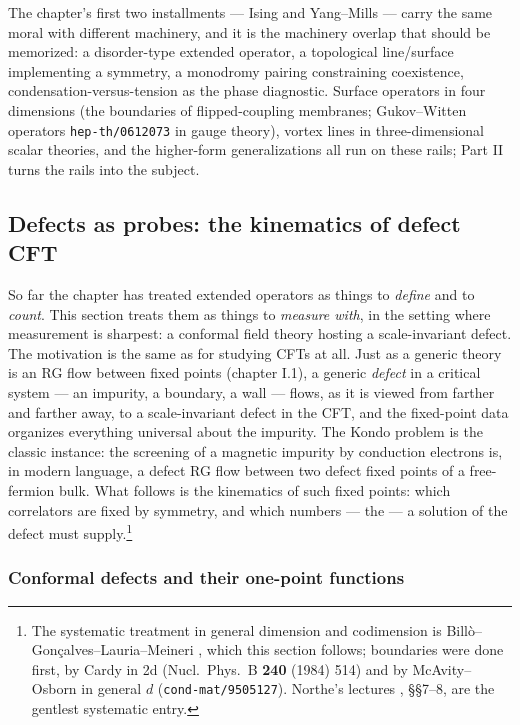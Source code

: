 The chapter's first two installments --- Ising and Yang--Mills --- carry
the same moral with different machinery, and it is the machinery overlap
that should be memorized: a disorder-type extended operator, a
topological line/surface implementing a symmetry, a monodromy pairing
constraining coexistence, condensation-versus-tension as the phase
diagnostic. Surface operators in four dimensions (the boundaries of
flipped-coupling membranes; Gukov--Witten operators
\texttt{hep-th/0612073} in gauge theory), vortex lines in
three-dimensional scalar theories, and the higher-form generalizations
all run on these rails; Part II turns the rails into the subject.


\subsection{Defects as probes: the kinematics of defect CFT}
\label{sec:defect-cft}

So far the chapter has treated extended operators as things to
\emph{define} and to \emph{count}. This section treats them as things to
\emph{measure with}, in the setting where measurement is sharpest: a
conformal field theory hosting a scale-invariant defect. The motivation
is the same as for studying CFTs at all. Just as a generic theory is an
RG flow between fixed points (chapter I.1), a generic \emph{defect} in a
critical system --- an impurity, a boundary, a wall --- flows, as it is
viewed from farther and farther away, to a scale-invariant defect in the
CFT, and the fixed-point data organizes everything universal about the
impurity. The Kondo problem is the classic instance: the screening of a
magnetic impurity by conduction electrons is, in modern language, a
defect RG flow between two defect fixed points of a free-fermion bulk.
What follows is the kinematics of such fixed points: which correlators
are fixed by symmetry, and which numbers --- the  --- a solution of the defect must supply.\footnote{The systematic
treatment in general dimension and codimension is
Bill\`o--Gon\c{c}alves--Lauria--Meineri , which this
section follows; boundaries were done first, by Cardy in 2d (Nucl.\
Phys.\ B \textbf{240} (1984) 514) and by McAvity--Osborn in general $d$
(\texttt{cond-mat/9505127}). Northe's lectures \arxiv{2411.03381},
\S\S7--8, are the gentlest systematic entry.}

\subsubsection{Conformal defects and their one-point functions}

